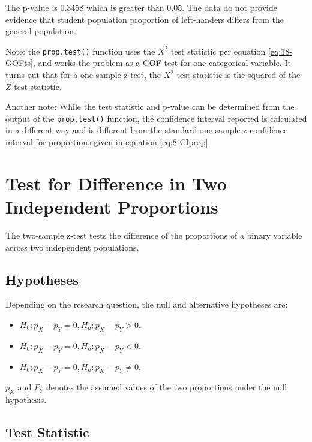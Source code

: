 \documentclass[
]{book}
\providecommand{\tightlist}{%
  \setlength{\itemsep}{0pt}\setlength{\parskip}{0pt}}
\theoremstyle{definition}
\theoremstyle{definition}
\theoremstyle{definition}
\theoremstyle{definition}
\theoremstyle{remark}
\begin{document}
The p-value is 0.3458 which is greater than 0.05. The data do not provide evidence that student population proportion of left-handers differs from the general population.

Note: the \texttt{prop.test()} function uses the \(X^2\) test statistic per equation \eqref{eq:18-GOFts}, and works the problem as a GOF test for one categorical variable. It turns out that for a one-sample z-test, the \(X^2\) test statistic is the squared of the \(Z\) test statistic.

Another note: While the test statistic and p-value can be determined from the output of the \texttt{prop.test()} function, the confidence interval reported is calculated in a different way and is different from the standard one-sample z-confidence interval for proportions given in equation \eqref{eq:8-CIprop}.

\hypertarget{test-for-difference-in-two-independent-proportions}{%
\section{Test for Difference in Two Independent Proportions}\label{test-for-difference-in-two-independent-proportions}}

The two-sample z-test tests the difference of the proportions of a binary variable across two independent populations.

\hypertarget{hypotheses-4}{%
\subsection{Hypotheses}\label{hypotheses-4}}

Depending on the research question, the null and alternative hypotheses are:

\begin{itemize}
\tightlist
\item
  \(H_0: p_X - p_Y = 0, H_a: p_X - p_Y > 0\).
\item
  \(H_0: p_X - p_Y = 0, H_a: p_X - p_Y < 0\).
\item
  \(H_0: p_X - p_Y = 0, H_a: p_X - p_Y \neq 0\).
\end{itemize}

\(p_X\) and \(P_Y\) denotes the assumed values of the two proportions under the null hypothesis.

\hypertarget{test-statistic-6}{%
\subsection{Test Statistic}\label{test-statistic-6}}
\end{document}
